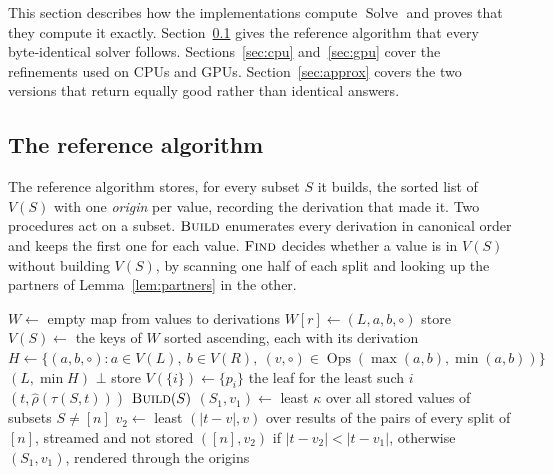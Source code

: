 \documentclass[11pt,a4paper]{article}
\theoremstyle{definition}
\theoremstyle{remark}
\newcommand{\proc}[1]{\textnormal{\textsc{#1}}}
\newcommand{\Ops}{\operatorname{Ops}}
\begin{document}
This section describes how the implementations compute $\operatorname{Solve}$ and proves that they compute
it exactly. Section~\ref{sec:reference} gives the reference algorithm that every byte-identical solver
follows. Sections~\ref{sec:cpu} and~\ref{sec:gpu} cover the refinements used on CPUs and GPUs.
Section~\ref{sec:approx} covers the two versions that return equally good rather than identical answers.

\subsection{The reference algorithm}\label{sec:reference}

The reference algorithm stores, for every subset $S$ it builds, the sorted list of $V(S)$ with one
\emph{origin} per value, recording the derivation that made it. Two procedures act on a subset.
$\proc{Build}$ enumerates every derivation in canonical order and keeps the first one for each value.
$\proc{Find}$ decides whether a value is in $V(S)$ without building $V(S)$, by scanning one half of
each split and looking up the partners of Lemma~\ref{lem:partners} in the other.

\begin{algorithm}[ht]
\caption{Reference solver for $\operatorname{Solve}(t, p)$}\label{alg:reference}
\begin{algorithmic}[1]
  \State $W \gets$ empty map from values to derivations
      \For{$(r, \circ) \in \Ops(\max(a, b), \min(a, b))$ in operator order}
         $W[r] \gets (L, a, b, \circ)$ \EndIf
      \EndFor
    \EndFor
  \EndFor
  \State store $V(S) \gets$ the keys of $W$ sorted ascending, each with its derivation
\EndProcedure
\Statex
{}
    \State $H \gets \{(a, b, \circ) : a \in V(L),\ b \in V(R),\ (v, \circ) \in \Ops(\max(a, b), \min(a, b))\}$
    \State {}
     \Return $(L, \min H)$ \EndIf
  \EndFor
  \State \Return $\bot$
\EndProcedure
\Statex
{}
   store $V(\{i\}) \gets \{p_i\}$ \EndFor
   \Return the leaf for the least such $i$ \EndIf
       \Return $(t, \hat\rho(\tau(S, t)))$ \EndIf
    \EndFor
      $\textsc{Build}(S)$ \EndFor \EndIf
  \EndFor
  \State $(S_1, v_1) \gets$ least $\kappa$ over all stored values of subsets $S \ne [n]$
  \State $v_2 \gets$ least $(|t - v|, v)$ over results of the pairs of every split of $[n]$, streamed and not stored
  \State \Return $([n], v_2)$ if $|t - v_2| < |t - v_1|$, otherwise $(S_1, v_1)$, rendered through the origins
\EndProcedure
\end{algorithmic}
\end{algorithm}
\end{document}
